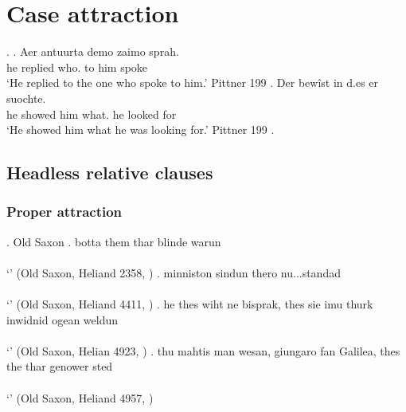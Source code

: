 
\chapter{Case attraction}


\ex.
\ag. Aer antuurta demo zaimo sprah.\\
he replied who. {to him} spoke\\
`He replied to the one who spoke to him.' Pittner 199
\bg. Der bewîst in d.es er suochte.\\
he showed him what. he {looked for}\\
`He showed him what he was looking for.' Pittner 199
\z.


\section{Headless relative clauses}

\subsection{Proper attraction}


\ex. Old Saxon
\ag. botta them thar blinde warun\\
 \\
 `' \hfill (Old Saxon, Heliand 2358, \citealt[761]{behaghel1923})
\bg. minniston sindun thero nu...standad\\
 \\
 `' \hfill (Old Saxon, Heliand 4411, \citealt[761]{behaghel1923})
\bg. he thes wiht ne bisprak, thes sie imu thurk inwidnid ogean weldun\\
 \\
 `' \hfill (Old Saxon, Helian 4923, \citealt[761]{behaghel1923})
\bg. thu mahtis man wesan, giungaro fan Galilea, thes the thar genower sted\\
 \\
 `' \hfill (Old Saxon, Heliand 4957, \citealt[761]{behaghel1923})

